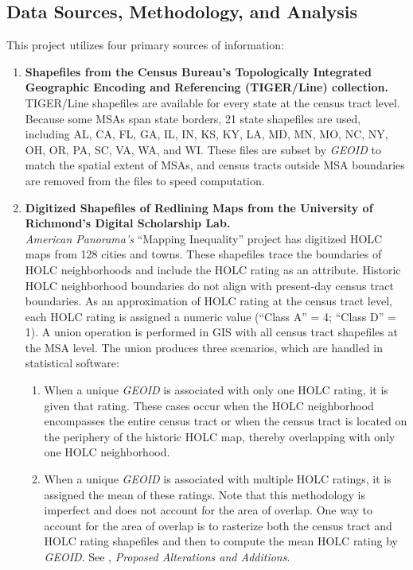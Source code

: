 \documentclass[paper=letter, fontsize=12pt]{scrartcl} %
\begin{document}
	\subsection{Data Sources, Methodology, and Analysis}
	This project utilizes four primary sources of information:
	\begin{enumerate}
		\item \textbf{Shapefiles from the Census Bureau's Topologically Integrated Geographic Encoding and Referencing (TIGER/Line) collection.} \cite{tiger17}\\
		TIGER/Line shapefiles are available for every state at the census tract level. Because some MSAs span state borders, 21 state shapefiles are used, including AL, CA, FL, GA, IL, IN, KS, KY, LA, MD, MN, MO, NC, NY, OH, OR, PA, SC, VA, WA, and WI. These files are subset by \textit{GEOID} to match the spatial extent of MSAs, and census tracts outside MSA boundaries are removed from the files to speed computation.
		\item \textbf{Digitized Shapefiles of Redlining Maps from the University of Richmond's Digital Scholarship Lab.} \cite{richmond} \\
		\textit{American Panorama's} ``Mapping Inequality'' project has digitized HOLC maps from 128 cities and towns. These shapefiles trace the boundaries of HOLC neighborhoods and include the HOLC rating as an attribute. Historic HOLC neighborhood boundaries do not align with present-day census tract boundaries. As an approximation of HOLC rating at the census tract level, each HOLC rating is assigned a numeric value (``Class A'' = 4; ``Class D'' = 1). A union operation is performed in GIS with all census tract shapefiles at the MSA level. The union produces three scenarios, which are handled in statistical software:
		\begin{enumerate}
			\item When a unique \textit{GEOID} is associated with only one HOLC rating, it is given that rating. These cases occur when the HOLC neighborhood encompasses the entire census tract or when the census tract is located on the periphery of the historic HOLC map, thereby overlapping with only one HOLC neighborhood.
			\item When a unique \textit{GEOID} is associated with multiple HOLC ratings, it is assigned the mean of these ratings. Note that this methodology is imperfect and does not account for the area of overlap. One way to account for the area of overlap is to rasterize both the census tract and HOLC rating shapefiles and then to compute the mean HOLC rating by \textit{GEOID}. See , \textit{Proposed Alterations and Additions}.

\end{enumerate}
\end{enumerate}
\end{document}
